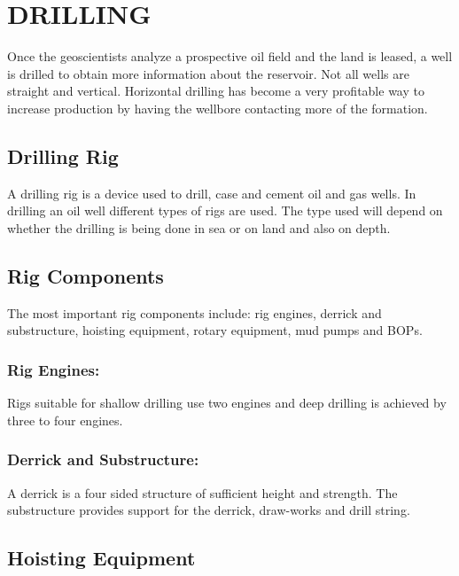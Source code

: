 \chapter{DRILLING}

\onehalfspacing

Once the geoscientists analyze a prospective oil field and the land is leased,
a well is drilled to obtain more information about the reservoir. 
Not all wells are straight and vertical. Horizontal drilling has become a
 very profitable way to increase production by having the wellbore contacting more of the formation.

\section*{Drilling Rig}

A drilling rig is a device used to drill, case and cement oil and gas wells. 
In drilling an oil well different types of rigs are used. The type used will
depend on whether the drilling is being done in sea or on land and also on depth.

\section*{Rig Components}
The most important rig components include:
 rig engines, derrick and substructure, hoisting equipment, rotary equipment, mud pumps and BOPs.
 
 
 
 \subsection*{Rig Engines:}
 
 Rigs suitable for shallow drilling use two engines and deep drilling is achieved by three to four engines.

\subsection*{Derrick and Substructure:}

A derrick is a four sided structure of sufficient height and strength. The
substructure provides support for the derrick, draw-works and drill string.


\section*{Hoisting Equipment}

